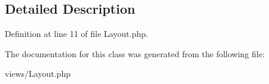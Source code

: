 \subsection{Detailed Description}


Definition at line 11 of file Layout.php.



The documentation for this class was generated from the following file:\begin{DoxyCompactItemize}
\item 
views/Layout.php\end{DoxyCompactItemize}
